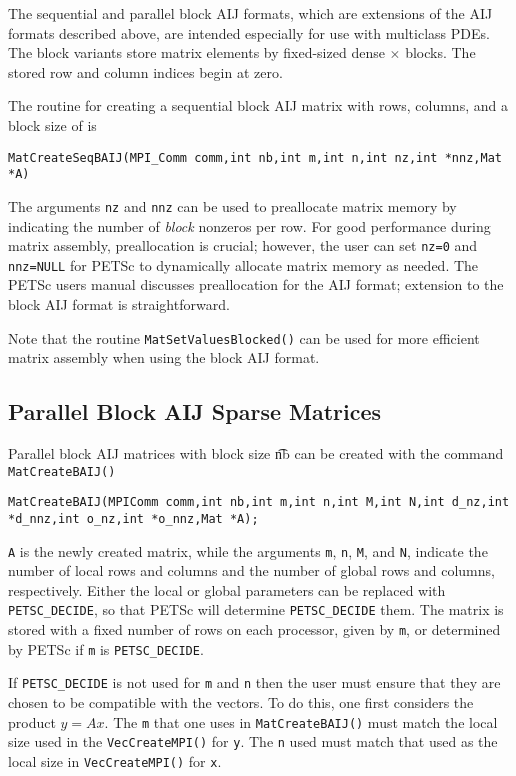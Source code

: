 The sequential and parallel block AIJ formats, which are extensions of
the AIJ formats described above, are intended especially for use with
multiclass PDEs.  The block variants store matrix elements by
fixed-sized dense  $\times$  blocks.  The stored row
and column indices begin at zero.

The routine for creating a sequential block AIJ matrix with 
rows,  columns, and a block size of  is
\begin{lstlisting}
MatCreateSeqBAIJ(MPI_Comm comm,int nb,int m,int n,int nz,int *nnz,Mat *A)
\end{lstlisting}
The arguments \lstinline{nz} and \lstinline{nnz} can be used to preallocate matrix
memory by indicating the number of {\em block} nonzeros per row.  For good
performance during matrix assembly, preallocation is crucial; however, the
user can set \lstinline{nz=0} and \lstinline{nnz=NULL} for PETSc to dynamically
allocate matrix memory as needed.  The PETSc users manual
discusses preallocation for the AIJ format; extension to the block AIJ
format is straightforward.

Note that the routine \lstinline{MatSetValuesBlocked()}
can be used for more efficient matrix assembly
when using the block AIJ format.

\subsection{Parallel Block AIJ Sparse Matrices}

Parallel block AIJ matrices with block size {\t nb} can be created with
the command \lstinline{MatCreateBAIJ()}
\begin{lstlisting}
MatCreateBAIJ(MPIComm comm,int nb,int m,int n,int M,int N,int d_nz,int *d_nnz,int o_nz,int *o_nnz,Mat *A);
\end{lstlisting}
\lstinline{A} is the newly created matrix, while the arguments \lstinline{m}, \lstinline{n},
\lstinline{M}, and \lstinline{N}, indicate the number of local rows and columns and
the number of global rows and columns, respectively. Either the local or
global parameters can be replaced with \lstinline{PETSC_DECIDE}, so that
PETSc will determine \lstinline{PETSC_DECIDE} them.
The matrix is stored with a fixed number of rows on
each processor, given by \lstinline{m}, or determined by PETSc if \lstinline{m} is
\lstinline{PETSC_DECIDE}.

If \lstinline{PETSC_DECIDE} is not used for
\lstinline{m} and \lstinline{n} then the user must ensure that they are chosen to be
compatible with the vectors. To do this, one first considers the product
$y = A x$. The \lstinline{m} that one uses in \lstinline{MatCreateBAIJ()}
must match the local size used in the \lstinline{VecCreateMPI()} for \lstinline{y}.
The \lstinline{n} used must match that used as the local size in
\lstinline{VecCreateMPI()} for \lstinline{x}.

